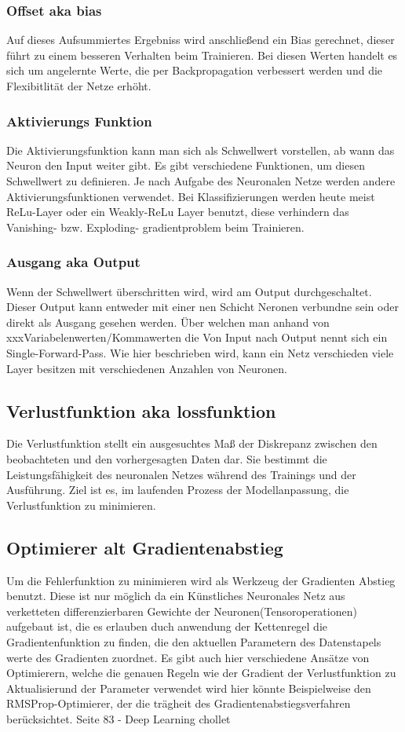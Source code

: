 \subsubsection{Offset aka bias}
Auf dieses Aufsummiertes Ergebniss wird anschließend ein Bias gerechnet, dieser führt zu einem besseren Verhalten beim Trainieren. Bei diesen Werten handelt es sich um angelernte Werte, die per Backpropagation verbessert werden und die Flexibitlität der Netze erhöht.


\subsubsection{Aktivierungs Funktion}
Die Aktivierungsfunktion kann man sich als Schwellwert vorstellen, ab wann das Neuron den Input weiter gibt. Es gibt verschiedene Funktionen, um diesen Schwellwert zu definieren. Je nach Aufgabe des Neuronalen Netze werden andere Aktivierungsfunktionen verwendet. Bei Klassifizierungen werden heute meist ReLu-Layer oder ein Weakly-ReLu Layer benutzt, diese verhindern das Vanishing- bzw. Exploding- gradientproblem beim Trainieren.

\subsubsection{Ausgang aka Output}
Wenn der Schwellwert überschritten wird, wird am Output durchgeschaltet. Dieser Output kann entweder mit einer nen Schicht Neronen verbundne sein oder direkt als Ausgang gesehen werden. Über welchen man anhand von xxxVariabelenwerten/Kommawerten die 
Von Input nach Output nennt sich ein Single-Forward-Pass. Wie hier beschrieben wird, kann ein Netz verschieden viele Layer besitzen mit verschiedenen Anzahlen von Neuronen.

\subsection{Verlustfunktion aka lossfunktion}
Die Verlustfunktion stellt ein ausgesuchtes Maß der Diskrepanz zwischen den beobachteten und den vorhergesagten Daten dar. Sie bestimmt die Leistungsfähigkeit des neuronalen Netzes während des Trainings und der Ausführung. Ziel ist es, im laufenden Prozess der Modellanpassung, die Verlustfunktion zu minimieren.

\subsection{Optimierer alt Gradientenabstieg}
Um die Fehlerfunktion zu minimieren wird als Werkzeug der Gradienten Abstieg benutzt. Diese ist nur möglich da ein Künstliches Neuronales Netz aus verketteten differenzierbaren Gewichte der Neuronen(Tensoroperationen) aufgebaut ist, die es erlauben duch anwendung der Kettenregel die Gradientenfunktion zu finden, die den aktuellen Parametern des Datenstapels werte des Gradienten zuordnet. Es gibt auch hier verschiedene Ansätze von Optimierern, welche die genauen Regeln wie der Gradient der Verlustfunktion zu Aktualisierund der Parameter verwendet wird hier könnte Beispielweise den RMSProp-Optimierer, der die trägheit des Gradientenabstiegsverfahren berücksichtet. Seite 83 - Deep Learning chollet


